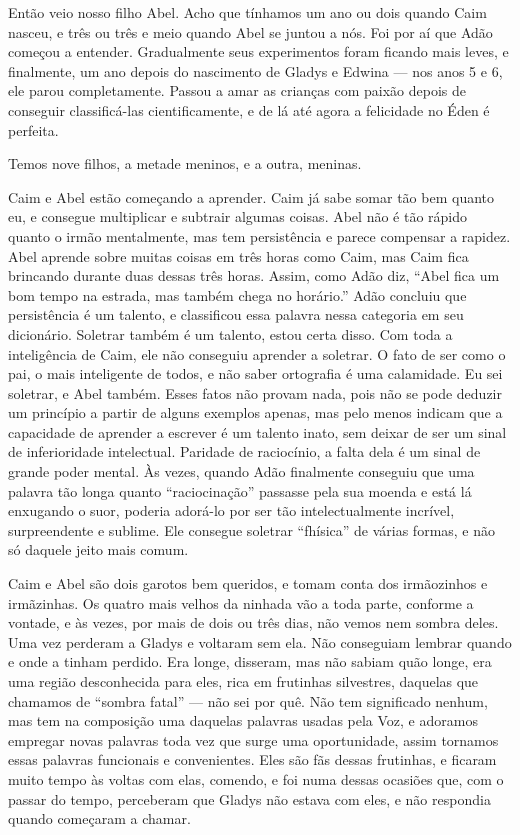  Então veio nosso filho Abel. Acho que tínhamos um ano ou dois quando Caim
nasceu, e três ou três e meio quando Abel se juntou a nós. Foi por aí que Adão
começou a entender. Gradualmente seus experimentos foram ficando mais leves, e
finalmente, um ano depois do nascimento de Gladys e Edwina --- nos anos 5 e 6, ele
parou completamente. Passou a amar as crianças com paixão depois de conseguir
classificá-las cientificamente, e de lá até agora a felicidade no Éden é
perfeita.

Temos nove filhos, a metade meninos, e a outra, meninas.

Caim e Abel estão começando a aprender. Caim já sabe somar tão bem quanto eu, e
consegue multiplicar e subtrair algumas coisas. Abel não é tão rápido quanto o
irmão mentalmente, mas tem persistência e parece compensar a rapidez. Abel aprende
sobre muitas coisas em três horas como Caim, mas Caim fica brincando durante duas
dessas três horas. Assim, como Adão diz, “Abel fica um bom tempo na estrada,
mas também chega no horário.” Adão concluiu que persistência é um talento, e
classificou essa palavra nessa categoria em seu dicionário. Soletrar também é
um talento, estou certa disso. Com toda a inteligência de Caim, ele não conseguiu
aprender a soletrar. O fato de ser como o pai, o mais inteligente
de todos, e não saber ortografia é uma calamidade. Eu sei soletrar, e Abel
também. Esses fatos não provam nada, pois não se pode deduzir um
princípio a partir de alguns exemplos apenas, mas pelo menos indicam que a capacidade
de aprender a escrever é um talento inato, sem deixar de
ser um sinal de inferioridade intelectual. Paridade de raciocínio, a falta dela é    
um sinal de grande poder mental. Às vezes, quando Adão finalmente conseguiu que uma
palavra tão longa quanto “raciocinação” passasse pela sua moenda e está lá enxugando o
suor, poderia adorá-lo por ser tão intelectualmente incrível, surpreendente e
sublime. Ele consegue soletrar “fhísica” de várias formas, e não só daquele jeito mais comum.

Caim e Abel são dois garotos bem queridos, e tomam conta dos irmãozinhos e
irmãzinhas. Os quatro mais velhos da ninhada vão a toda parte, conforme a vontade, e
às vezes, por mais de dois ou três dias, não vemos nem sombra deles. Uma vez
perderam a Gladys e voltaram sem ela. Não conseguiam lembrar
quando e onde a tinham perdido. Era longe, disseram, mas não sabiam quão longe,
era uma região desconhecida para eles, rica em frutinhas
silvestres, daquelas que chamamos de “sombra fatal” --- não sei por quê. Não tem
significado nenhum, mas tem na composição uma daquelas palavras usadas pela Voz, e
adoramos empregar novas palavras toda vez que surge uma oportunidade, assim
tornamos essas palavras funcionais e convenientes. Eles são fãs dessas frutinhas,
e ficaram muito tempo às voltas com elas, comendo, e foi numa dessas ocasiões que, com o passar do
tempo, perceberam que Gladys não estava com eles, e não respondia quando
começaram a chamar.

